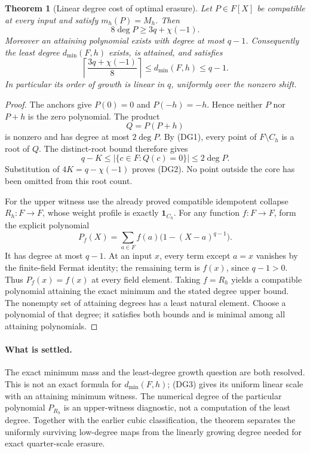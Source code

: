 \documentclass[11pt]{article}
\newtheorem{theorem}{Theorem}[section]
\begin{document}
\begin{theorem}[Linear degree cost of optimal erasure]
\label{thm:optimal-transport-degree}
Let \(P\in F[X]\) be compatible at every input and satisfy
\(m_h(P)=M_h\). Then
\[
             \boxed{\quad 8\deg P\ge3q+\chi(-1).\quad}       \tag{DG2}
\]
Moreover an attaining polynomial exists with degree at most \(q-1\).
Consequently the least degree \(d_{\min}(F,h)\) exists, is attained,
and satisfies
\[
 \boxed{\qquad
 \left\lceil\frac{3q+\chi(-1)}8\right\rceil
       \le d_{\min}(F,h)\le q-1.
 \qquad}                                                  \tag{DG3}
\]
In particular its order of growth is linear in \(q\), uniformly
over the nonzero shift.
\end{theorem}
\begin{proof}
The anchors give \(P(0)=0\) and \(P(-h)=-h\). Hence neither
\(P\) nor \(P+h\) is the zero polynomial. The product
\[
                           Q=P(P+h)
\]
is nonzero and has degree at most \(2\deg P\).
By (DG1), every point of \(F\setminus C_h\) is a root of \(Q\).
The distinct-root bound therefore gives
\[
 q-K\le|\{c\in F:Q(c)=0\}|\le2\deg P.
\]
Substitution of \(4K=q-\chi(-1)\) proves (DG2).
No point outside the core has been omitted from this root count.

For the upper witness use the already proved compatible
idempotent collapse \(R_h:F\to F\), whose weight profile is
exactly \(\mathbf1_{C_h}\).
For any function \(f:F\to F\), form the explicit polynomial
\[
 P_f(X)=\sum_{a\in F} f(a)
                    \bigl(1-(X-a)^{q-1}\bigr).             \tag{DG4}
\]
It has degree at most \(q-1\). At an input \(x\), every term
except \(a=x\) vanishes by the finite-field Fermat identity;
the remaining term is \(f(x)\), since \(q-1>0\).
Thus \(P_f(x)=f(x)\) at every field element.
Taking \(f=R_h\) yields a compatible polynomial attaining
the exact minimum and the stated degree upper bound.
The nonempty set of attaining degrees has a least natural
element. Choose a polynomial of that degree; it satisfies
both bounds and is minimal among all attaining polynomials.
\end{proof}

\paragraph{What is settled.}
The exact minimum mass and the least-degree growth question
are both resolved. This is not an exact formula for
\(d_{\min}(F,h)\); (DG3) gives its uniform linear scale with an
attaining minimum witness. The numerical degree of the
particular polynomial \(P_{R_h}\) is an upper-witness diagnostic,
not a computation of the least degree.
Together with the earlier cubic classification, the theorem
separates the uniformly surviving low-degree maps from the
linearly growing degree needed for exact quarter-scale erasure.
\end{document}
